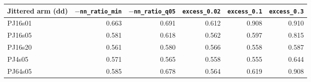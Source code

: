 \begin{tabular}{lrrrrr}\toprule
Jittered arm (dd) & $-$\texttt{nn\_ratio\_min} & $-$\texttt{nn\_ratio\_q05} & \texttt{excess\_0.02} & \texttt{excess\_0.1} & \texttt{excess\_0.3}\\\midrule
PJ16s01 & 0.663 & 0.691 & 0.612 & 0.908 & 0.910\\
PJ16s05 & 0.581 & 0.618 & 0.562 & 0.597 & 0.815\\
PJ16s20 & 0.561 & 0.580 & 0.566 & 0.558 & 0.587\\
PJ4s05 & 0.571 & 0.565 & 0.558 & 0.555 & 0.644\\
PJ64s05 & 0.585 & 0.678 & 0.564 & 0.619 & 0.908\\
\bottomrule\end{tabular}
